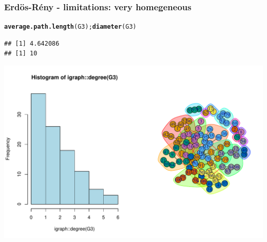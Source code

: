 \documentclass{beamer}\usepackage[]{graphicx}\usepackage[]{color}
\makeatletter
\newcommand{\hlstd}[1]{\textcolor[rgb]{0.345,0.345,0.345}{#1}}%
\newcommand{\hlkwd}[1]{\textcolor[rgb]{0.737,0.353,0.396}{\textbf{#1}}}%
\newenvironment{kframe}{%
 \def\at@end@of@kframe{}%
 \ifinner\ifhmode%
  \def\at@end@of@kframe{\end{minipage}}%
  \begin{minipage}{\columnwidth}%
 \fi\fi%
 \def\FrameCommand##1{\hskip\@totalleftmargin \hskip-\fboxsep
 \colorbox{shadecolor}{##1}\hskip-\fboxsep
     \hskip-\linewidth \hskip-\@totalleftmargin \hskip\columnwidth}%
 \MakeFramed {\advance\hsize-\width
   \@totalleftmargin\z@ \linewidth\hsize
   \@setminipage}}%
 {\par\unskip\endMakeFramed%
 \at@end@of@kframe}
\newenvironment{knitrout}{}{} %
\makeatother
\begin{document}
\begin{frame}[fragile]
  \frametitle{Erdös-Rény - limitations: very homegeneous}

\begin{knitrout}\scriptsize
{}\color{fgcolor}\begin{kframe}
\begin{alltt}
\hlkwd{average.path.length}\hlstd{(G3);} \hlkwd{diameter}\hlstd{(G3)}
\end{alltt}
\begin{verbatim}
## [1] 4.642086
## [1] 10
\end{verbatim}
\end{kframe}
\end{knitrout}

\begin{knitrout}\scriptsize
{}\color{fgcolor}
\includegraphics[width=.8\textwidth]{figures/ER_limitation2-1} 

\end{knitrout}
\end{frame}
\end{document}
